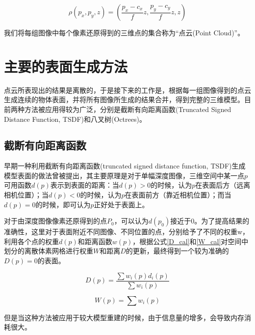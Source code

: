 \documentclass{llncs}
\begin{document}
\begin{CJK}{UTF8}{song}
\begin{equation}
\label{get3dpoint}
	\rho(p_x,p_y,z) = (\frac{p_x-c_x}{f}z,\frac{p_y-c_y}{f}z,z)
\end{equation}

我们将每组图像中每个像素还原得到的三维点的集合称为“点云(Point Cloud)”。


\section{主要的表面生成方法}

点云所表现出的结果是离散的，于是接下来的工作是，根据每一组图像得到的点云生成连续的物体表面，并将所有图像所生成的结果合并，得到完整的三维模型。目前两种方法被应用得较为广泛，分别是截断有向距离函数(Truncated Signed Distance Function, TSDF)和八叉树(Octrees)。

	\subsection{截断有向距离函数}

早期一种利用截断有向距离函数(truncated signed distance function, TSDF)生成模型表面的做法\cite{DBLP:conf/siggraph/CurlessL96}曾被提出，其主要原理是对于单幅深度图像，三维空间中某一点$p$可用函数$d(p)$表示到表面的距离：当$d(p)>0$的时候，认为$p$在表面后方（远离相机位置）；当$d(p)<0$的时候，认为$p$在表面前方（靠近相机位置）；而当$d(p)=0$的时候，即可认为$p$正好处于表面上。

对于由深度图像像素还原得到的点$P_0$，可以认为$d(p_0)$接近于0。为了提高结果的准确性，这里对于表面附近不同图像、不同位置的点，分别给予了不同的权重w，利用各个点的权重$d(p)$和距离函数$w(p)$，根据公式\ref{D_cal}和\ref{W_cal}对空间中划分的离散体素网格进行权重$W$和距离$D$的更新，最终得到一个较为准确的$D(p)=0$的表面。

\begin{equation}
\label{D_cal}
	D(p) = \frac{\sum w_i(p)d_i(p)}{\sum w_i(p)}
\end{equation}

\begin{equation}
\label{W_cal}
	W(p) = \sum w_i(p)
\end{equation}

但是当这种方法被应用于较大模型重建的时候，由于信息量的增多，会导致内存消耗很大。






\end{CJK}
\end{document}
